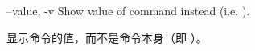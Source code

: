 \begin{docKey}
  {--value, -v}{}%
  {}%
  Show value of command instead (i.e. ).

  显示命令的值，而不是命令本身（即 ）。

  \begin{commandshell} 
  \end{commandshell}  
  \end{docKey}